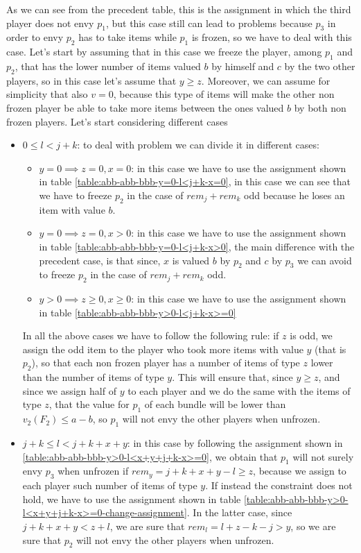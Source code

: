 \documentclass{article}
\begin{document}
As we can see from the precedent table, this is the assignment in which the third player does not envy $p_1$, but this case still can lead to problems because $p_3$ in order to envy $p_2$ has to take items while $p_1$ is frozen, so we have to deal with this case. Let's start by assuming that in this case we freeze the player, among $p_1$ and $p_2$, that has the lower number of items valued $b$ by himself and $c$ by the two other players, so in this case let's assume that $y\ge z$. Moreover, we can assume for simplicity that also $v=0$, because this type of items will make the other non frozen player be able to take more items between the ones valued $b$ by both non frozen players. Let's start considering different cases 
\begin{itemize}
    \item $0\le l< j + k$: to deal with problem we can divide it in different cases:
    \begin{itemize}
        \item $y = 0 \implies z = 0, x = 0$: in this case we have to use the assignment shown in table \ref{table:abb-abb-bbb-y=0-l<j+k-x=0}, in this case we can see that we have to freeze $p_2$ in the case of $rem_j+rem_k$ odd because he loses an item with value $b$.
        \item $y = 0 \implies z = 0, x > 0$: in this case we have to use the assignment shown in table \ref{table:abb-abb-bbb-y=0-l<j+k-x>0}, the main difference with the precedent case, is that since, $x$ is valued $b$ by $p_2$ and $c$ by $p_3$ we can avoid to freeze $p_2$ in the case of $rem_j+rem_k$ odd.
        \item $y > 0 \implies z \ge 0, x \ge 0$: in this case we have to use the assignment shown in table \ref{table:abb-abb-bbb-y>0-l<j+k-x>=0}
    \end{itemize}
    In all the above cases we have to follow the following rule: if $z$ is odd, we assign the odd item to the player who took more items with value $y$ (that is $p_2$), so that each non frozen player has a number of items of type $z$ lower than the number of items of type $y$. This will ensure that, since $y \ge z$, and since we assign half of $y$ to each player and we do the same with the items of type $z$, that the value for $p_1$ of each bundle will be lower than $v_2(F_2)\le a-b$, so $p_1$ will not envy the other players when unfrozen. 
    \item $j + k \le l< j + k + x + y$: in this case by following the assignment shown in \ref{table:abb-abb-bbb-y>0-l<x+y+j+k-x>=0}, we obtain that $p_1$ will not surely envy $p_3$ when unfrozen if $rem_y = j + k + x + y-l \ge z$, because we assign to each player such number of items of type $y$. If instead the constraint does not hold, we have to use the assignment shown in table \ref{table:abb-abb-bbb-y>0-l<x+y+j+k-x>=0-change-assignment}. In the latter case, since $j + k + x + y < z + l$, we are sure that $rem_l = l + z - k - j > y$, so we are sure that $p_2$ will not envy the other players when unfrozen.

\end{itemize}
\end{document}
